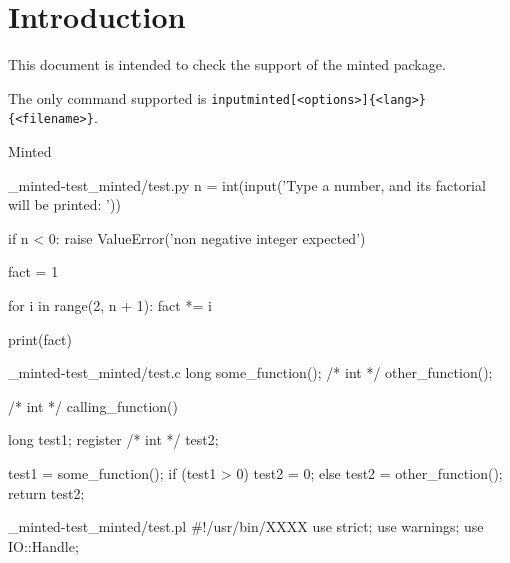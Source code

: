 \documentclass{article}
\begin{document}
\section*{Introduction}

This document is intended to check the support of the \textsf{minted} package.

The only command supported is 
\texttt{inputminted[<options>]\{<lang>\}\{<filename>\}}.

\begin{quiz}{Minted}



\begin{VerbatimOut}{_minted-test_minted/test.py}
n = int(input('Type a number, and its factorial will be printed: '))

if n < 0:
    raise ValueError('non negative integer expected')

fact = 1

for i in range(2, n + 1):
    fact *= i

print(fact)
\end{VerbatimOut}

\begin{VerbatimOut}{_minted-test_minted/test.c}
long some_function();
/* int */ other_function();

/* int */ calling_function()
{
    long test1;
    register /* int */ test2;

    test1 = some_function();
    if (test1 > 0)
          test2 = 0;
    else
          test2 = other_function();
    return test2;
}
\end{VerbatimOut}

\begin{VerbatimOut}{_minted-test_minted/test.pl}
#!/usr/bin/XXXX
use strict;
use warnings;
use IO::Handle;


\end{VerbatimOut}
\end{quiz}
\end{document}
